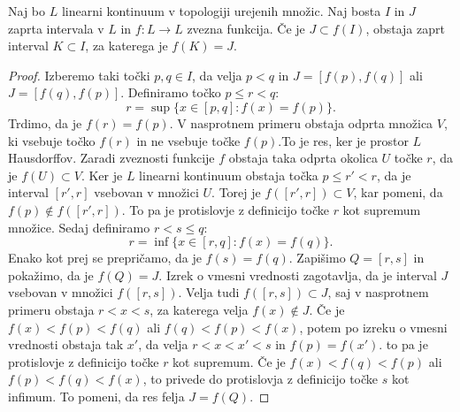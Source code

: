 \documentclass[mat2]{fmfdelo}
\begin{document}
\begin{lema}
Naj bo $L$ linearni kontinuum v topologiji urejenih množic. Naj bosta $I$ in $J$ zaprta intervala v $L$ in $f:L \to L$ zvezna funkcija. Če je $J \subset f(I)$, obstaja zaprt interval $K \subset I$, za katerega je $f(K) = J$.
\end{lema}
\begin{proof}
Izberemo taki točki $p, q \in I$, da velja $p<q$ in $J=[f(p), f(q)]$ ali $J=[f(q), f(p)]$. Definiramo točko $p \leq r < q$:
$$r= \sup\{x \in [p, q] : f(x) = f(p)\}.$$
Trdimo, da je $f(r) = f(p)$. V nasprotnem primeru obstaja odprta množica $V$, ki vsebuje točko $f(r)$ in ne vsebuje točke $f(p)$.To je res, ker je prostor $L$ Hausdorffov. Zaradi zveznosti funkcije $f$ obstaja taka odprta okolica $U$ točke $r$, da je $f(U) \subset V$. Ker je $L$ linearni kontinuum obstaja točka $p \leq r' < r$, da je interval $[r', r]$ vsebovan v množici $U$. Torej je $f([r', r]) \subset V$, kar pomeni, da $f(p) \notin f([r', r])$. To pa je protislovje z definicijo točke $r$ kot supremum množice.
Sedaj definiramo $r<s \leq q$:
$$r= \inf\{x \in [r, q] : f(x) = f(q)\}.$$ 
Enako kot prej se prepričamo, da je $f(s) = f(q)$. Zapišimo $Q = [r, s]$ in pokažimo, da je $f(Q) = J$. Izrek o vmesni vrednosti zagotavlja, da je interval $J$ vsebovan v množici $f([r, s])$. Velja tudi $f([r, s]) \subset J$, saj v nasprotnem primeru obstaja $r<x<s$, za katerega velja $f(x) \notin J$. Če je $f(x) < f(p) < f(q)$ ali $f(q) < f(p) < f(x)$, potem po izreku o vmesni vrednosti obstaja tak $x'$, da velja $r<x<x'<s$ in $f(p) = f(x')$. to pa je protislovje z definicijo točke $r$ kot supremum. Če je $f(x) < f(q) < f(p)$ ali $f(p) < f(q) < f(x)$, to privede do protislovja z definicijo točke $s$ kot infimum. To pomeni, da res felja $J = f(Q)$.
\end{proof}
\end{document}
